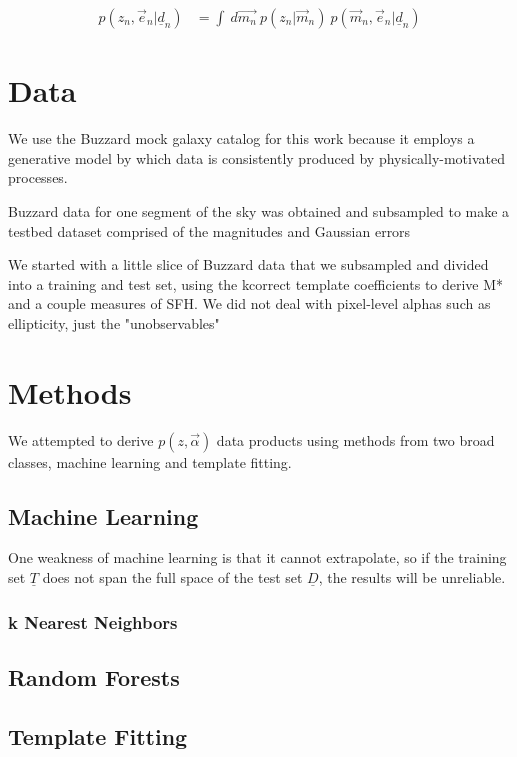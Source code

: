 \documentclass[12pt, preprint]{aastex}
\newcommand{\textul}{\underline}
\begin{document}
\begin{align}
\label{eq:ellipticity-general}
p(z_{n}, \vec{e}_{n}|\textul{d}_{n}) &= \int\ d\vec{m_{n}}\ p(z_{n}|\vec{m}_{n})\ p(\vec{m}_{n}, \vec{e}_{n}|\textul{d}_{n})
\end{align}

\section{Data}

We use the Buzzard mock galaxy catalog for this work because it employs a generative model by which data is consistently produced by physically-motivated processes.

Buzzard data for one segment of the sky was obtained and subsampled to make a testbed dataset comprised of the magnitudes and Gaussian errors

We started with a little slice of Buzzard data that we subsampled and divided into a training and test set, using the kcorrect template coefficients to derive M* and a couple measures of SFH.  We did not deal with pixel-level alphas such as ellipticity, just the "unobservables"

\section{Methods}

We attempted to derive $p(z,\vec{\alpha})$ data products using methods from two broad classes, machine learning and template fitting.

\subsection{Machine Learning}

One weakness of machine learning is that it cannot extrapolate, so if the training set $\textul{T}$ does not span the full space of the test set $\textul{D}$, the results will be unreliable.

\subsubsection{k Nearest Neighbors}

\subsection{Random Forests}

\subsection{Template Fitting}
\end{document}
